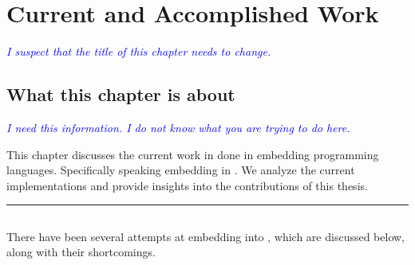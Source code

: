 \documentclass[thesis-solanki.tex]{subfiles}
\begin{document}
\chapter{Current and Accomplished Work}\label{chap:proposedWork}

\textcolor{blue}{\textsl{I suspect that the title of this chapter needs to change.}}

\section{What this chapter is about}\label{sec:what-this-chapter:proposedWork}

\textcolor{blue}{\textsl{I need this information.
    I do not know what you are trying to do here.
}}

This chapter discusses the current work in done in embedding programming languages. Specifically speaking embedding  in 
. We analyze the current implementations and provide insights into the contributions of this thesis. 

\noindent\rule{\textwidth}{0.5pt}


\section{}

There have been several attempts at embedding  into , which are
discussed below, along with their shortcomings.
\end{document}
